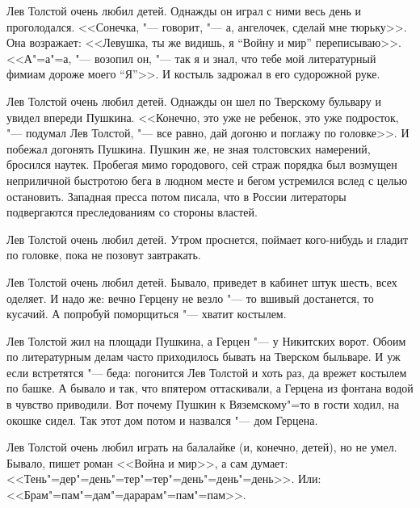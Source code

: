 Лев Толстой очень любил детей. Однажды он играл с ними весь день и проголодался.
<<Сонечка, "--- говорит, "--- а, ангелочек, сделай мне тюрьку>>. Она возражает: 
<<Левушка, ты же видишь, я ``Войну и мир'' переписываю>>. <<А"=а"=а, "--- 
возопил он, "--- так я и знал, что тебе мой литературный фимиам дороже моего 
``Я''>>. И костыль задрожал в его судорожной руке.

Лев Толстой очень любил детей. Однажды он шел по Тверскому бульвару и увидел 
впереди Пушкина. <<Конечно, это уже не ребенок, это уже подросток, "--- подумал
Лев Толстой, "--- все равно, дай догоню и поглажу по головке>>. И побежал 
догонять Пушкина. Пушкин же, не зная толстовских намерений, бросился наутек. 
Пробегая мимо городового, сей страж порядка был возмущен неприличной быстротою 
бега в людном месте и бегом устремился вслед с целью остановить. Западная пресса
потом писала, что в России литераторы подвергаются преследованиям со стороны 
властей.

Лев Толстой очень любил детей. Утром проснется, поймает кого-нибудь и гладит по 
головке, пока не позовут завтракать.

Лев Толстой очень любил детей. Бывало, приведет в кабинет штук шесть, всех 
оделяет. И надо же: вечно Герцену не везло "--- то вшивый достанется, то 
кусачий. А попробуй поморщиться "--- хватит костылем.

Лев Толстой жил на площади Пушкина, а Герцен "--- у Никитских ворот. Обоим по 
литературным делам часто приходилось бывать на Тверском быльваре. И уж если 
встретятся "--- беда: погонится Лев Толстой и хоть раз, да врежет костылем по
башке. А бывало и так, что впятером оттаскивали, а Герцена из фонтана водой в
чувство приводили. Вот почему Пушкин к Вяземскому"=то в гости ходил, на окошке  
сидел. Так этот дом потом и назвался "--- дом Герцена.

Лев Толстой очень любил играть на балалайке (и, конечно, детей), но не умел. 
Бывало, пишет роман <<Война и мир>>, а сам думает: 
<<Тень"=дер"=день"=тер"=тер"=день"=день"=день>>. Или: 
<<Брам"=пам"=дам"=дарарам"=пам"=пам>>.